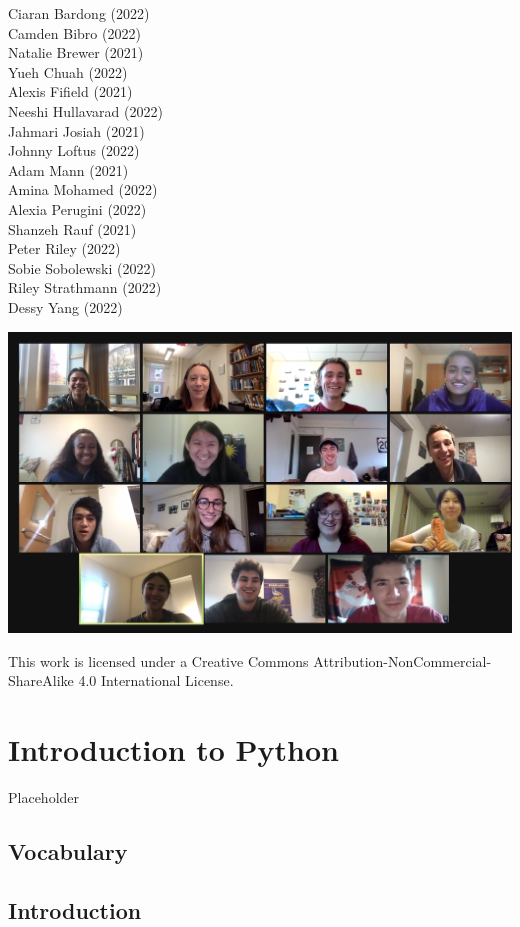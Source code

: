 \documentclass[
]{book}
\begin{document}
Ciaran Bardong (2022)\\
Camden Bibro (2022)\\
Natalie Brewer (2021)\\
Yueh Chuah (2022)\\
Alexis Fifield (2021)\\
Neeshi Hullavarad (2022)\\
Jahmari Josiah (2021)\\
Johnny Loftus (2022)\\
Adam Mann (2021)\\
Amina Mohamed (2022)\\
Alexia Perugini (2022)\\
Shanzeh Rauf (2021)\\
Peter Riley (2022)\\
Sobie Sobolewski (2022)\\
Riley Strathmann (2022)\\
Dessy Yang (2022)

\includegraphics{images/class2020.png}

This work is licensed under a Creative Commons Attribution-NonCommercial-ShareAlike 4.0 International License.

\hypertarget{Ch1}{%
\chapter{Introduction to Python}\label{Ch1}}

Placeholder

\hypertarget{vocabulary}{%
\section{Vocabulary}\label{vocabulary}}

\hypertarget{introduction}{%
\section{Introduction}\label{introduction}}
\end{document}
